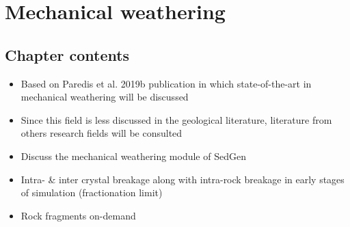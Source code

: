 \chapter{Mechanical weathering}\label{ch:mechanical_weathering}

\section{Chapter contents}
\begin{itemize}
    \item Based on Paredis et al. 2019b publication in which state-of-the-art in mechanical weathering will be discussed
    \item Since this field is less discussed in the geological literature, literature from others research fields will be consulted
    \item Discuss the mechanical weathering module of SedGen
    \item Intra- \& inter crystal breakage along with intra-rock breakage in early stages of simulation (fractionation limit)
    \item Rock fragments on-demand

\end{itemize}




\cleardoublepage

